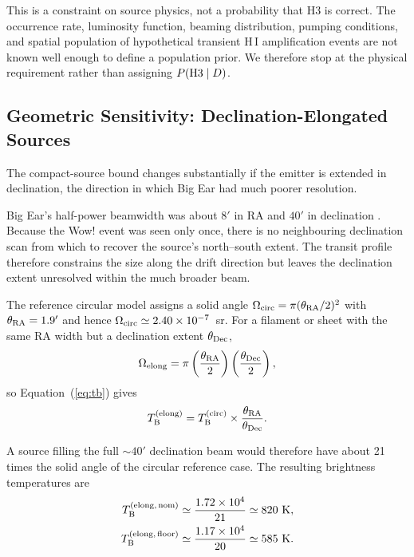 \documentclass[crop]{CSL}
\newcommand{\tbeq}{T_{\rm B}}
\begin{document}
This is a constraint on source physics, not a probability that H3 is correct. The occurrence rate, luminosity function, beaming distribution, pumping conditions, and spatial population of hypothetical transient H\,I amplification events are not known well enough to define a population prior. We therefore stop at the physical requirement rather than assigning $P({\rm H3}\mid D)$.

\subsection{Geometric Sensitivity: Declination-Elongated Sources}
\label{sec:h3_geometry}

The compact-source bound changes substantially if the emitter is extended in declination, the direction in which Big Ear had much poorer resolution.

Big Ear's half-power beamwidth was about $8'$ in RA and $40'$ in declination \citep{ehman1997,mendez2024}. Because the Wow! event was seen only once, there is no neighbouring declination scan from which to recover the source's north--south extent. The transit profile therefore constrains the size along the drift direction but leaves the declination extent unresolved within the much broader beam.

The reference circular model assigns a solid angle $\Omega_{\rm circ}=\pi(\theta_{\rm RA}/2)^2$ with $\theta_{\rm RA}=1.9'$ and hence $\Omega_{\rm circ}\simeq2.40\times10^{-7}$~sr. For a filament or sheet with the same RA width but a declination extent $\theta_{\rm Dec}$,
\begin{equation}
\Omega_{\rm elong}
=
\pi\left(\frac{\theta_{\rm RA}}{2}\right)
\left(\frac{\theta_{\rm Dec}}{2}\right),
\label{eq:omega_elong}
\end{equation}
so Equation~(\ref{eq:tb}) gives
\begin{equation}
\tbeq^{\rm (elong)}
=
\tbeq^{\rm (circ)}\times\frac{\theta_{\rm RA}}{\theta_{\rm Dec}}.
\label{eq:tb_elong}
\end{equation}

A source filling the full $\sim40'$ declination beam would therefore have about 21 times the solid angle of the circular reference case. The resulting brightness temperatures are
\begin{align}
\tbeq^{\rm (elong,\,nom)}
&\simeq
\frac{1.72\times10^4}{21}
\simeq
820~{\rm K},
\nonumber\\
\tbeq^{\rm (elong,\,floor)}
&\simeq
\frac{1.17\times10^4}{20}
\simeq
585~{\rm K}.
\label{eq:tb_elong_values}
\end{align}
\end{document}
